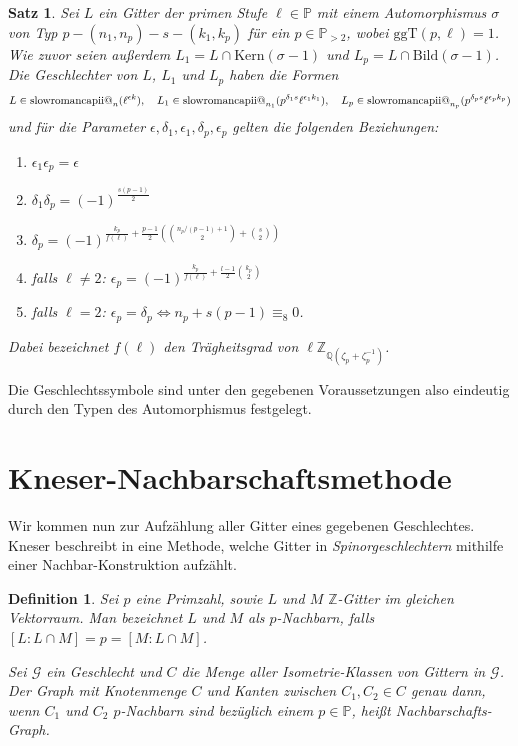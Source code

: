 \documentclass[12pt,a4paper,halfparskip,headsepline,bibtotocnumbered]{scrreprt}
\makeatletter
\theoremstyle{nummermitklammern}
\newtheorem{definition}[defsatzusw]{Definition}
\newtheorem{satz}[defsatzusw]{Satz}
\theoremstyle{nonumberbreak}
\newcommand{\Z}{\mathbb{Z}}
\newcommand{\Q}{\mathbb{Q}}
\renewcommand{\P}{\mathbb{P}}
\newcommand{\ii}{\text{\expandafter\@slowromancap\romannumeral 2@}}
\newcommand{\Kern}{\text{Kern}}
\newcommand{\Bild}{\text{Bild}}
\newcommand{\ggT}{\text{ggT}}
\makeatother
\begin{document}
\begin{framed}
	\begin{satz}
		Sei $L$ ein Gitter der primen Stufe $\ell \in \P$ mit einem Automorphismus $\sigma$ von Typ $p - (n_1, n_p) - s - (k_1, k_p)$ für ein $p \in \P_{> 2}$, wobei $\ggT(p, \ell) = 1$. Wie zuvor seien außerdem $L_1 = L \cap \Kern(\sigma-1)$ und $L_p = L \cap \Bild(\sigma-1)$. Die Geschlechter von $L$, $L_1$ und $L_p$ haben die Formen
		\begin{equation*}
			L \in \ii_n(\ell^{\epsilon k}), \quad L_1 \in \ii_{n_1}(p^{\delta_1 s} \ell^{\epsilon_1 k_1}), \quad L_p \in \ii_{n_p}(p^{\delta_p s} \ell^{\epsilon_p k_p})
		\end{equation*}	
		und für die Parameter $\epsilon, \delta_1, \epsilon_1, \delta_p, \epsilon_p$ gelten die folgenden Beziehungen:
		\begin{enumerate}[label=(\roman*)]
			\item $\epsilon_1 \epsilon_p = \epsilon$
			\item $\delta_1 \delta_p = (-1)^{\frac{s(p-1)}{2}}$
			\item $\delta_p = (-1)^{\frac{k_p}{f(\ell)} + \frac{p-1}{2}\left({n_p / (p-1) +1 \choose 2} + {s \choose 2}\right)}$
			\item falls $\ell \neq 2$: $\epsilon_p = (-1)^{\frac{k_p}{f(\ell)} + \frac{l-1}{2} {k_p \choose 2}}$
			\item falls $\ell = 2$: $\epsilon_p = \delta_p \Leftrightarrow n_p + s(p-1) \equiv_8 0$.
		\end{enumerate}
		Dabei bezeichnet $f(\ell)$ den Trägheitsgrad von $\ell \Z_{\Q(\zeta_p + \zeta_p^{-1})}$.
	\end{satz}
\end{framed}

Die Geschlechtssymbole sind unter den gegebenen Voraussetzungen also eindeutig durch den Typen des Automorphismus festgelegt.

\section{Kneser-Nachbarschaftsmethode}

Wir kommen nun zur Aufzählung aller Gitter eines gegebenen Geschlechtes. Kneser beschreibt in \cite[Abschnitt 28]{kneser} eine Methode, welche Gitter in \textit{Spinorgeschlechtern} mithilfe einer Nachbar-Konstruktion aufzählt.

\begin{framed}
	\begin{definition}
		Sei $p$ eine Primzahl, sowie $L$ und $M$ $\Z$-Gitter im gleichen Vektorraum. Man bezeichnet $L$ und $M$ als \textit{$p$-Nachbarn}, falls $\left[ L : L \cap M \right] = p = \left[ M : L \cap M \right]$.\par
		Sei $\mathcal{G}$ ein Geschlecht und $C$ die Menge aller Isometrie-Klassen von Gittern in $\mathcal{G}$. Der Graph mit Knotenmenge $C$ und Kanten zwischen $C_1, C_2 \in C$ genau dann, wenn $C_1$ und $C_2$ $p$-Nachbarn sind bezüglich einem $p \in \P$, heißt \textit{Nachbarschafts-Graph}.
	\end{definition}
\end{framed}
\end{document}
